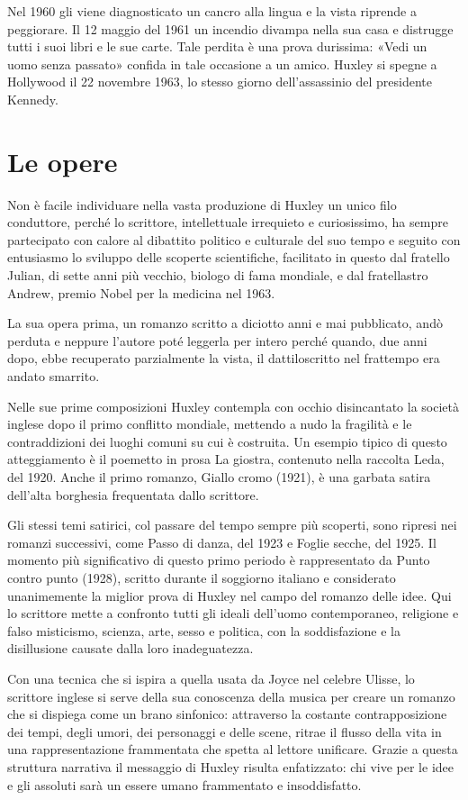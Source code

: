 \documentclass[
a5paper, %
10pt, %
twoside, 
onecolumn, %
openany, %
]{memoir}
\begin{document}
Nel 1960 gli viene diagnosticato un cancro alla lingua e la vista riprende a peggiorare. Il 12 maggio del 1961 un incendio divampa nella sua casa e distrugge tutti i suoi libri e le sue carte. Tale perdita è una prova durissima: «Vedi un uomo senza passato» confida in tale occasione a un amico. Huxley si spegne a Hollywood il 22 novembre 1963, lo stesso giorno dell’assassinio del presidente Kennedy.

\chapter*{Le opere}

Non è facile individuare nella vasta produzione di Huxley un unico filo conduttore, perché lo scrittore, intellettuale irrequieto e curiosissimo, ha sempre partecipato con calore al dibattito politico e culturale del suo tempo e seguito con entusiasmo lo sviluppo delle scoperte scientifiche, facilitato in questo dal fratello Julian, di sette anni più vecchio, biologo di fama mondiale, e dal fratellastro Andrew, premio Nobel per la medicina nel 1963.

La sua opera prima, un romanzo scritto a diciotto anni e mai pubblicato, andò perduta e neppure l’autore poté leggerla per intero perché quando, due anni dopo, ebbe recuperato parzialmente la vista, il dattiloscritto nel frattempo era andato smarrito.

Nelle sue prime composizioni Huxley contempla con occhio disincantato la società inglese dopo il primo conflitto mondiale, mettendo a nudo la fragilità e le contraddizioni dei luoghi comuni su cui è costruita. Un esempio tipico di questo atteggiamento è il poemetto in prosa La giostra, contenuto nella raccolta Leda, del 1920. Anche il primo romanzo, Giallo cromo (1921), è una garbata satira dell’alta borghesia frequentata dallo scrittore.

Gli stessi temi satirici, col passare del tempo sempre più scoperti, sono ripresi nei romanzi successivi, come Passo di danza, del 1923 e Foglie secche, del 1925. Il momento più significativo di questo primo periodo è rappresentato da Punto contro punto (1928), scritto durante il soggiorno italiano e considerato unanimemente la miglior prova di Huxley nel campo del romanzo delle idee. Qui lo scrittore mette a confronto tutti gli ideali dell’uomo contemporaneo, religione e falso misticismo, scienza, arte, sesso e politica, con la soddisfazione e la disillusione causate dalla loro inadeguatezza.

Con una tecnica che si ispira a quella usata da Joyce nel celebre Ulisse, lo scrittore inglese si serve della sua conoscenza della musica per creare un romanzo che si dispiega come un brano sinfonico: attraverso la costante contrapposizione dei tempi, degli umori, dei personaggi e delle scene, ritrae il flusso della vita in una rappresentazione frammentata che spetta al lettore unificare. Grazie a questa struttura narrativa il messaggio di Huxley risulta enfatizzato: chi vive per le idee e gli assoluti sarà un essere umano frammentato e insoddisfatto.
\end{document}
